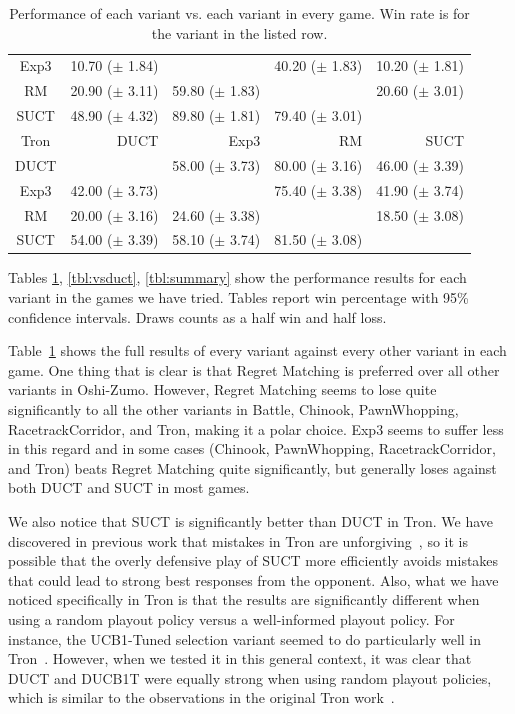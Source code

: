 \documentclass[conference]{IEEEtran}
\begin{document}
\begin{table}
\begin{center}
\begin{tabular}{|c|rrrr|}
           Exp3    & 10.70 ($\pm$ 1.84)   &          & 40.20 ($\pm$ 1.83)   & 10.20 ($\pm$ 1.81)   \\
             RM    & 20.90 ($\pm$ 3.11)   & 59.80 ($\pm$ 1.83)   &          & 20.60 ($\pm$ 3.01)   \\
           SUCT    & 48.90 ($\pm$ 4.32)   & 89.80 ($\pm$ 1.81)   & 79.40 ($\pm$ 3.01)   &          \\
\hline
\hline
           Tron   &       DUCT   &       Exp3   &         RM   &       SUCT   \\
\hline
           DUCT    &          & 58.00 ($\pm$ 3.73)   & 80.00 ($\pm$ 3.16)   & 46.00 ($\pm$ 3.39)   \\
           Exp3    & 42.00 ($\pm$ 3.73)   &          & 75.40 ($\pm$ 3.38)   & 41.90 ($\pm$ 3.74)   \\
             RM    & 20.00 ($\pm$ 3.16)   & 24.60 ($\pm$ 3.38)   &          & 18.50 ($\pm$ 3.08)   \\
           SUCT    & 54.00 ($\pm$ 3.39)   & 58.10 ($\pm$ 3.74)   & 81.50 ($\pm$ 3.08)   &          \\
\hline
\end{tabular}
\end{center}
\caption{Performance of each variant vs. each variant in every game. Win rate is for the variant in the listed row. \label{tbl:cross}}
\end{table}

Tables \ref{tbl:cross}, \ref{tbl:vsduct}, \ref{tbl:summary} show the performance results for each variant in the games we have tried. 
Tables report win percentage with 95\% confidence intervals. Draws counts as a half win and half loss. 

Table~\ref{tbl:cross} shows the full results of every variant against every other variant in each game. One thing that is clear is that 
Regret Matching is preferred over all other variants in Oshi-Zumo. However, Regret Matching seems to lose quite significantly to all the 
other variants in Battle, Chinook, PawnWhopping, RacetrackCorridor, and Tron, making it a polar choice. Exp3 seems to suffer less in this
regard and in some cases (Chinook, PawnWhopping, RacetrackCorridor, and Tron) beats Regret Matching quite significantly, but generally loses
against both DUCT and SUCT in most games. 

We also notice that SUCT is significantly better than DUCT in Tron. We have discovered in previous work that mistakes in
Tron are unforgiving~\cite{Lanctot13Tron}, 
so it is possible that the overly defensive play of SUCT more efficiently avoids mistakes that could lead to strong best responses from the opponent.
Also, what we have noticed specifically in Tron is that the results are significantly different when 
using a random playout policy versus a well-informed playout policy. For instance, the UCB1-Tuned selection variant seemed to do particularly 
well in Tron~\cite{Perick12Comparison,Lanctot13Tron}. However, when we tested it in this general context, it was clear that DUCT and DUCB1T were 
equally strong when using random playout policies, which is similar to the observations in the original Tron work~\cite{Samothrakis10Tron}.
\end{document}
